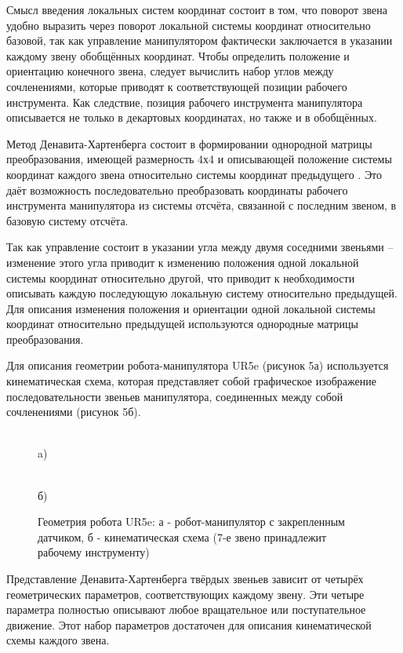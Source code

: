 Смысл введения локальных систем координат состоит в том, что поворот звена удобно выразить через поворот локальной системы координат относительно базовой, так как управление манипулятором фактически заключается в указании каждому звену обобщённых координат. Чтобы определить положение и ориентацию конечного звена, следует вычислить набор углов между сочленениями, которые приводят к соответствующей позиции рабочего инструмента. Как следствие, позиция рабочего инструмента манипулятора описывается не только в декартовых координатах, но также и в обобщённых.

Метод Денавита-Хартенберга состоит в формировании однородной матрицы преобразования, имеющей размерность 4х4 и описывающей положение системы координат каждого звена относительно системы координат предыдущего \cite{litlink10}. Это даёт возможность последовательно преобразовать координаты рабочего инструмента манипулятора из системы отсчёта, связанной с последним звеном, в базовую систему отсчёта.

Так как управление состоит в указании угла между двумя соседними звеньями – изменение этого угла приводит к изменению положения одной локальной системы координат относительно другой, что приводит к необходимости описывать каждую последующую локальную систему относительно предыдущей. Для описания изменения положения и ориентации одной локальной системы координат относительно предыдущей используются однородные матрицы преобразования.

Для описания геометрии робота-манипулятора UR5e (рисунок 5а) используется кинематическая схема, которая представляет собой графическое изображение последовательности звеньев манипулятора, соединенных между собой сочленениями (рисунок 5б).

\begin{figure}[H]
\begin{minipage}[h]{0.47\linewidth}
 \\a) 
\end{minipage}
\hfill
\begin{minipage}[h]{0.47\linewidth}
 \\б)
\end{minipage}
\caption{Геометрия робота UR5e: а - робот-манипулятор с закрепленным датчиком, б - кинематическая схема (7-е звено принадлежит рабочему инструменту)}
\label{ris:experimentalcorrelationsignals}
\end{figure}

Представление Денавита-Хартенберга твёрдых звеньев зависит от четырёх геометрических параметров, соответствующих каждому звену. Эти четыре параметра полностью описывают любое вращательное или поступательное движение. Этот набор параметров достаточен для описания кинематической схемы каждого звена.

